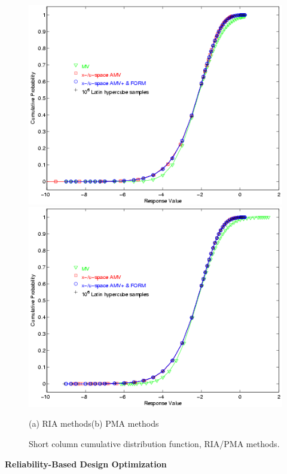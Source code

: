\begin{figure}
\centering
\centerline{\includegraphics[scale=0.5]{images/short_col_cdf_ria}
            \includegraphics[scale=0.5]{images/short_col_cdf_pma}}
(a) RIA methods\hspace{2.75in}(b) PMA methods
\caption{Short column cumulative distribution function, RIA/PMA methods.}
\label{fig:short_col_cdf}
\end{figure}

{\bf Reliability-Based Design Optimization} \\

